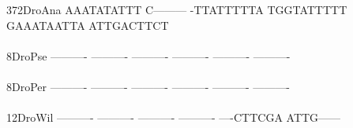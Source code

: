 \documentclass[11pt,twoside,reqno,a4paper]{article}
\begin{document}
{372\hspace*{2\charwidth}DroAna	AAATATATTT	C---------	-TTATTTTTA	TGGTATTTTT	GAAATAATTA	ATTGACTTCT	\\
\hspace*{5\charwidth}\hspace*{7\charwidth}\hspace*{1\charwidth}\hspace*{1\charwidth}\hspace*{1\charwidth}\hspace*{1\charwidth}\hspace*{1\charwidth}\hspace*{1\charwidth}\\
8\hspace*{4\charwidth}DroPse	----------	----------	----------	----------	----------	----------	\\
\hspace*{5\charwidth}\hspace*{7\charwidth}\hspace*{1\charwidth}\hspace*{1\charwidth}\hspace*{1\charwidth}\hspace*{1\charwidth}\hspace*{1\charwidth}\hspace*{1\charwidth}\\
8\hspace*{4\charwidth}DroPer	----------	----------	----------	----------	----------	----------	\\
\hspace*{5\charwidth}\hspace*{7\charwidth}\hspace*{1\charwidth}\hspace*{1\charwidth}\hspace*{1\charwidth}\hspace*{1\charwidth}\hspace*{1\charwidth}\hspace*{1\charwidth}\\
12\hspace*{3\charwidth}DroWil	----------	----------	----------	----------	----CTTCGA	ATTG------	\\
\hspace*{5\charwidth}\hspace*{7\charwidth}\hspace*{1\charwidth}\hspace*{1\charwidth}\hspace*{1\charwidth}\hspace*{1\charwidth}\hspace*{1\charwidth}\hspace*{1\charwidth}\\
}
\end{document}
